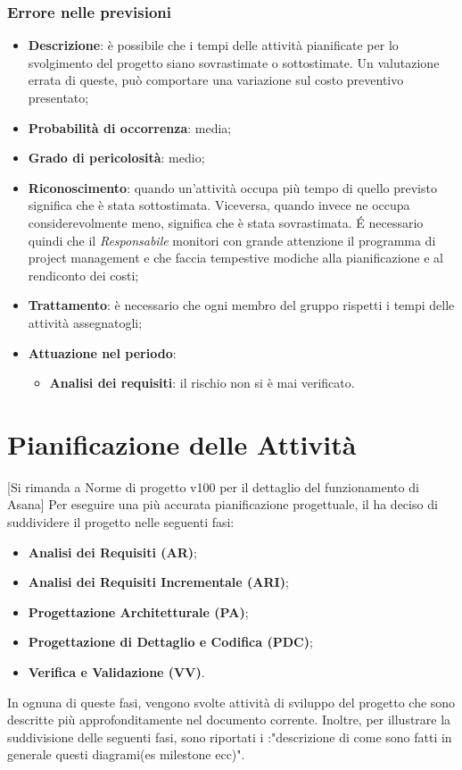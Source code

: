 		\subsubsection{Errore nelle previsioni}
		\begin{itemize}
			\item \textbf{Descrizione}: è possibile che i tempi delle attività pianificate per lo svolgimento del progetto siano sovrastimate o sottostimate. Un valutazione errata di queste, può comportare una variazione sul costo preventivo presentato; 
			\item \textbf{Probabilità di occorrenza}: media;
			\item \textbf{Grado di pericolosità}: medio;
			\item \textbf{Riconoscimento}: quando un'attività occupa più tempo di quello previsto significa che è stata sottostimata. Viceversa, quando invece ne occupa considerevolmente meno, significa che è stata sovrastimata. É necessario quindi che il \textit{Responsabile} monitori con grande attenzione il programma di project management e che faccia tempestive modiche alla pianificazione e al rendiconto dei costi; 
			\item \textbf{Trattamento}: è necessario che ogni membro del gruppo rispetti i tempi delle attività assegnatogli; 
			\item \textbf{Attuazione nel periodo}:
			\begin{itemize}
				\item \textbf{Analisi dei requisiti}:  il rischio non si è mai verificato.
			\end{itemize}
		\end{itemize}
\section{Pianificazione delle Attività}
[Si rimanda a Norme di progetto v100 per il dettaglio del funzionamento di Asana]
Per eseguire una più accurata pianificazione progettuale, il  ha deciso di suddividere il progetto nelle seguenti fasi:
\begin{itemize}
	\item \textbf{Analisi dei Requisiti (AR)};
	\item \textbf{Analisi dei Requisiti Incrementale (ARI)};
	\item \textbf{Progettazione Architetturale (PA)};
	\item \textbf{Progettazione di Dettaglio e Codifica (PDC)};
	\item \textbf{Verifica e Validazione (VV)}.
\end{itemize}
In ognuna di queste fasi, vengono svolte attività di sviluppo del progetto che sono descritte più approfonditamente nel documento corrente.
Inoltre, per illustrare la suddivisione delle seguenti fasi, sono riportati i :"descrizione di come sono fatti in generale 
questi diagrami(es milestone ecc)".
